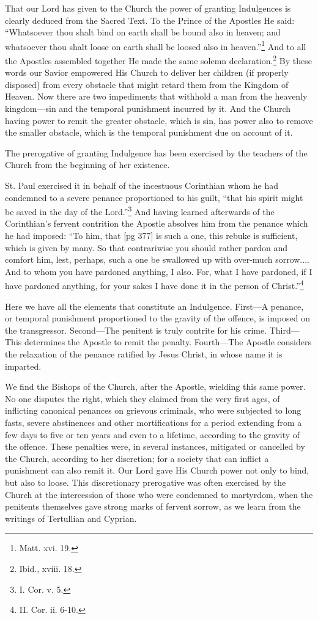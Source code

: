 That our Lord has given to the Church the
power of granting Indulgences is clearly deduced
from the Sacred Text. To the Prince of the Apostles
He said: “Whatsoever thou shalt bind on
earth shall be bound also in heaven; and whatsoever
thou shalt loose on earth shall be loosed also
in heaven.”\footnote{Matt. xvi.
19.} And to all the Apostles assembled
together He made the same solemn declaration.\footnote{Ibid., xviii. 18.}
By these words our Savior empowered His
Church to deliver her children (if properly disposed)
from every obstacle that might retard them
from the Kingdom of Heaven. Now there are two
impediments that withhold a man from the
heavenly kingdom—sin and the temporal punishment
incurred by it. And the Church having
power to remit the greater obstacle, which is sin,
has power also to remove the smaller obstacle,
which is the temporal punishment due on account
of it.

The prerogative of granting Indulgence has
been exercised by the teachers of the Church from
the beginning of her existence.

St. Paul exercised it in behalf of the incestuous
Corinthian whom he had condemned to a severe
penance proportioned to his guilt, “that his spirit
might be saved in the day of the Lord.”\footnote{I. Cor. v. 5.} And
having learned afterwards of the Corinthian's
fervent contrition the Apostle absolves him from
the penance which he had imposed: “To him, that
[pg 377]
is such a one, this rebuke is sufficient, which is
given by many. So that contrariwise you should
rather pardon and comfort him, lest, perhaps, such
a one be swallowed up with over-much sorrow....
And to whom you have pardoned anything,
I also. For, what I have pardoned, if I have pardoned
anything, for your sakes I have done it in
the person of Christ.”\footnote{II. Cor. ii. 6-10.}

Here we have all the elements that constitute an
Indulgence. First—A penance, or temporal
punishment proportioned to the gravity of the offence,
is imposed on the transgressor. Second—The
penitent is truly contrite for his crime. Third—This
determines the Apostle to remit the
penalty. Fourth—The Apostle considers the
relaxation of the penance ratified by Jesus Christ,
in whose name it is imparted.

We find the Bishops of the Church, after the
Apostle, wielding this same power. No one disputes
the right, which they claimed from the very
first ages, of inflicting canonical penances on
grievous criminals, who were subjected to long
fasts, severe abstinences and other mortifications
for a period extending from a few days to five or
ten years and even to a lifetime, according to the
gravity of the offence. These penalties were, in
several instances, mitigated or cancelled by the
Church, according to her discretion; for a society
that can inflict a punishment can also remit it.
Our Lord gave His Church power not only to bind,
but also to loose. This discretionary prerogative
was often exercised by the Church at the intercession
of those who were condemned to martyrdom,
when the penitents themselves gave strong marks
of fervent sorrow, as we learn from the writings
of Tertullian and Cyprian.

